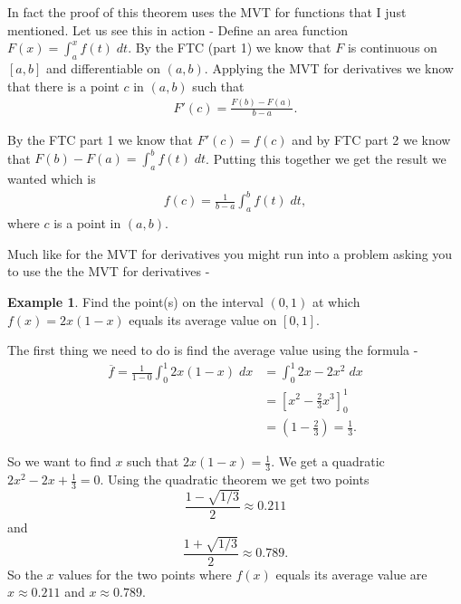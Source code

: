 \documentclass[12pt,reqno]{article}
\theoremstyle{definition}
\newtheorem*{Example}{Example}
\begin{document}
In fact the proof of this theorem uses the MVT for functions that I just mentioned. Let us see this in action - Define an area function $F(x) = \int_{a}^{x} f(t)\;dt$. By the FTC (part 1) we know that $F$ is continuous on $[a, b]$ and differentiable on $(a, b)$. Applying the MVT for derivatives we know that there is a point $c$ in $(a, b)$ such that 
\begin{align*}
	F'(c) = \frac{F(b) - F(a)}{ b - a}. 
\end{align*}

By the FTC part 1 we know that $F'(c) = f(c)$ and by FTC part 2 we know that $F(b) - F(a) = \int_{a}^{b} f(t) \;dt$. Putting this together we get the result we wanted which is 
\begin{align*}
	f(c) = \frac{1}{b - a} \int_{a}^{b} f(t) \; dt,
\end{align*}
where $c$ is a point in $(a, b)$. 


Much like for the MVT for derivatives you might run into a problem asking you to use the the MVT for derivatives - 
\begin{Example}
	Find the point(s) on the interval $(0, 1)$ at which $f(x) = 2x(1 - x)$ equals its average value on $[0, 1]$. 
	
	The first thing we need to do is find the average value using the formula - 
	\begin{align*}
		\overline{f} = \frac{1}{1 - 0} \int_{0}^{1} 2x(1 - x) \; dx &= \int_{0}^{1} 2x - 2x^2 \;dx \\
		&= \left[x^2 - \frac{2}{3} x^3 \right]_{0}^{1}  \\
		&= \left(1 - \frac{2}{3} \right) = \frac{1}{3}.
	\end{align*}

	So we want to find $x$ such that $2x (1 - x) = \frac{1}{3}$. We get a quadratic $2x^2 - 2x + \frac{1}{3} = 0$. Using the quadratic theorem we get two points $$\frac{1 - \sqrt{1/3}}{2} \approx 0.211$$ and $$\frac{1 + \sqrt{1/3}}{2} \approx 0.789.$$ So the $x$ values for the two points where $f(x)$ equals its average value are $x \approx 0.211$ and $x \approx 0.789$. 
\end{Example}
\end{document}

